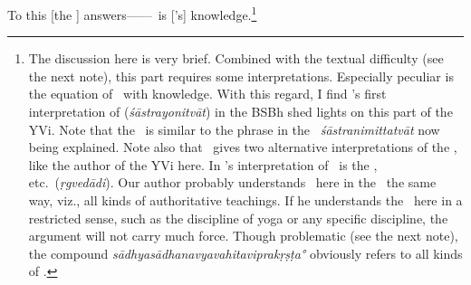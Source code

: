 To %
 this [the \Bhasyakara] answers------\sastra\ is [\Isvara's] knowledge.\footnote{The discussion here is very brief.  Combined with the textual difficulty (see the next note), this part requires some interpretations.  Especially peculiar is the equation of \sastra\ with knowledge.  With this regard, I find \Sankara's first interpretation of  (\emph{śāstrayonitvāt}) in the BSBh shed lights on this part of the YVi.  Note that the \sutra\ is similar to the phrase in the \YBh\ \emph{śāstranimittatvāt} now being explained.  Note also that \Sankara\ gives two alternative interpretations of the \sutra, like the author of the YVi here.  In \Sankara's interpretation of  \sastra\ is the \Rgveda, etc.\ (\emph{ṛgvedādi}).  Our author probably understands \sastra\ here in the \YBh\ the same way, viz., all kinds of authoritative teachings.  If he understands the \sastra\ here in a restricted sense, such as the discipline of yoga or any specific discipline, the argument will not carry much force.  Though problematic (see the next note), the compound \emph{sādhyasādhanavyavahitaviprakṛṣṭa°} obviously refers to all kinds of \sastra.

}
